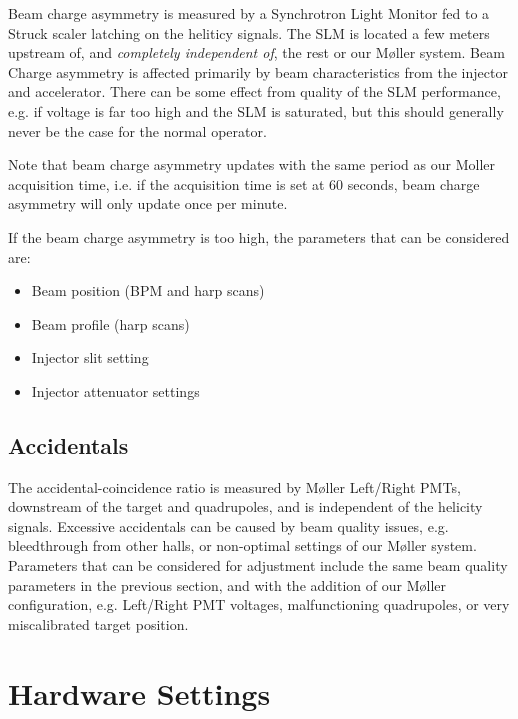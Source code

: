 \documentclass[amsmath,amssymb,notitlepage,12pt]{revtex4}
\begin{document}
Beam charge asymmetry is measured by a Synchrotron Light Monitor fed to a Struck scaler latching on the heliticy signals.  The SLM is located a few meters upstream of, and {\em completely independent of}, the rest or our M{\o}ller system.  Beam Charge asymmetry is affected primarily by beam characteristics from the injector and accelerator.  There can be some effect from quality of the SLM performance, e.g. if voltage is far too high and the SLM is saturated, but this should generally never be the case for the normal operator.

Note that beam charge asymmetry updates with the same period as our Moller acquisition time, i.e. if the acquisition time is set at 60 seconds, beam charge asymmetry will only update once per minute.

If the beam charge asymmetry is too high, the parameters that can be considered are:

\begin{itemize}
    \vspace{-4mm}\item Beam position (BPM and harp scans)
    \vspace{-4mm}\item Beam profile (harp scans)
    \vspace{-4mm}\item Injector slit setting
    \vspace{-4mm}\item Injector attenuator settings
\end{itemize}

\subsection{Accidentals}

The accidental-coincidence ratio is measured by M{\o}ller Left/Right PMTs, downstream of the target and quadrupoles, and is independent of the helicity signals.  Excessive accidentals can be caused by beam quality issues, e.g. bleedthrough from other halls, or non-optimal settings of our M{\o}ller system.  Parameters that can be considered for adjustment include the same beam quality parameters in the previous section, and with the addition of our M{\o}ller configuration, e.g. Left/Right PMT voltages, malfunctioning quadrupoles, or very miscalibrated target position.

\section{Hardware Settings}
\end{document}
